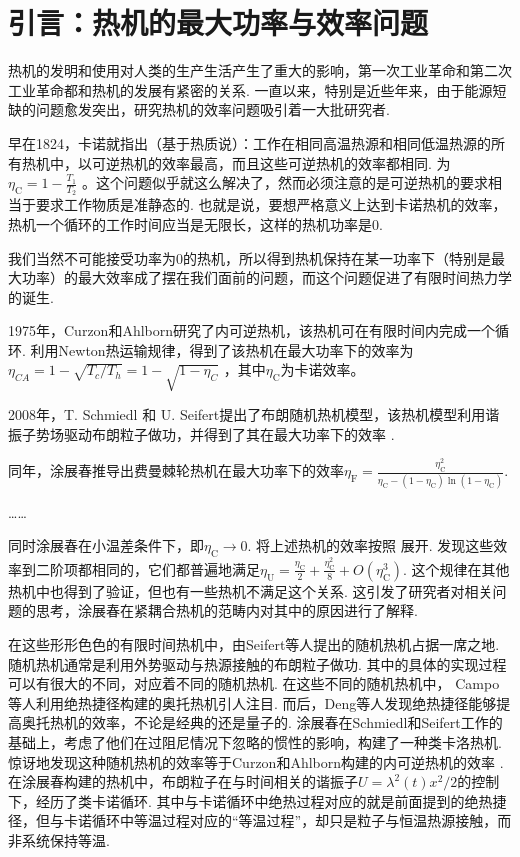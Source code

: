 \chapter{引言：热机的最大功率与效率问题}
热机的发明和使用对人类的生产生活产生了重大的影响，第一次工业革命和第二次工业革命都和热机的发展有紧密的关系. 一直以来，特别是近些年来，由于能源短缺的问题愈发突出，研究热机的效率问题吸引着一大批研究者.

早在1824，卡诺就指出（基于热质说）\cite{2005}：工作在相同高温热源和相同低温热源的所有热机中，以可逆热机的效率最高，而且这些可逆热机的效率都相同. 为$\eta _{\text{C}}=1-\frac{T_1}{T_2}$ 。这个问题似乎就这么解决了，然而必须注意的是可逆热机的要求相当于要求工作物质是准静态的. 也就是说，要想严格意义上达到卡诺热机的效率，热机一个循环的工作时间应当是无限长，这样的热机功率是0.

我们当然不可能接受功率为0的热机，所以得到热机保持在某一功率下（特别是最大功率）的最大效率成了摆在我们面前的问题，而这个问题促进了有限时间热力学的诞生. 

1975年，Curzon和Ahlborn研究了内可逆热机\cite{Curzon1975}，该热机可在有限时间内完成一个循环. 利用Newton热运输规律，得到了该热机在最大功率下的效率为$\eta _{CA}=1-\sqrt{T_c/T_h}=1-\sqrt{1-\eta _C}$ ，其中$\eta _\text{C}$为卡诺效率。

2008年，T. Schmiedl 和 U. Seifert提出了布朗随机热机模型\cite{Schmiedl2008}，该热机模型利用谐振子势场驱动布朗粒子做功，并得到了其在最大功率下的效率 . 

同年，涂展春推导出费曼棘轮热机\cite{Tu2008}在最大功率下的效率$\eta _{\text{F}}=\frac{\eta _{\text{C}}^{2}}{\eta _{\text{C}}-\left( 1-\eta _{\text{C}} \right) \ln \left( 1-\eta _{\text{C}} \right)}$. \cite{Tu2020}

……

同时涂展春\cite{Tu2008}在小温差条件下，即$\eta _{\text{C}}\rightarrow 0$. 将上述热机的效率按照 展开. 发现这些效率到二阶项都相同的，它们都普遍地满足$\eta _{\text{U}}=\frac{\eta _{\text{C}}}{2}+\frac{\eta _{\text{C}}^{2}}{8}+O\left( \eta _{\text{C}}^{3} \right)$. 这个规律在其他热机中也得到了验证，但也有一些热机不满足这个关系. 这引发了研究者对相关问题的思考，涂展春在紧耦合热机的范畴内对其中的原因进行了解释.\cite{Tu2020}

在这些形形色色的有限时间热机中，由Seifert等人提出的随机热机\cite{Schmiedl2008}占据一席之地. 随机热机通常是利用外势驱动与热源接触的布朗粒子做功. 其中的具体的实现过程可以有很大的不同，对应着不同的随机热机. 在这些不同的随机热机中， Campo等人利用绝热捷径构建的奥托热机\cite{DelCampo2014}引人注目. 而后，Deng等人发现绝热捷径能够提高奥托热机的效率，不论是经典的还是量子的.\cite{Deng2013} 涂展春在Schmiedl和Seifert工作\cite{Schmiedl2008}的基础上，考虑了他们在过阻尼情况下忽略的惯性的影响，构建了一种类卡洛热机\cite{Tu2013}. 惊讶地发现这种随机热机的效率等于Curzon和Ahlborn构建的内可逆热机\cite{Curzon1975}的效率 . 在涂展春构建的热机中\cite{Tu2013}，布朗粒子在与时间相关的谐振子$U=\lambda ^2\left( t \right) x^2/2$的控制下，经历了类卡诺循环. 其中与卡诺循环中绝热过程对应的就是前面提到的绝热捷径，但与卡诺循环中等温过程对应的“等温过程”，却只是粒子与恒温热源接触，而非系统保持等温. 

